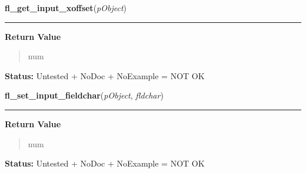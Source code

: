     \label{xformslib:library:fl_get_input_xoffset}

    \vspace{0.5ex}

\hspace{.8\funcindent}\begin{boxedminipage}{\funcwidth}

    \raggedright \textbf{fl\_get\_input\_xoffset}(\textit{pObject})

    \vspace{-1.5ex}

    \rule{\textwidth}{0.5\fboxrule}
\setlength{\parskip}{2ex}
\setlength{\parskip}{1ex}
      \textbf{Return Value}
    \vspace{-1ex}

      \begin{quote}
      num

      \end{quote}

\textbf{Status:} Untested + NoDoc + NoExample = NOT OK



    \end{boxedminipage}

    \label{xformslib:library:fl_set_input_fieldchar}

    \vspace{0.5ex}

\hspace{.8\funcindent}\begin{boxedminipage}{\funcwidth}

    \raggedright \textbf{fl\_set\_input\_fieldchar}(\textit{pObject}, \textit{fldchar})

    \vspace{-1.5ex}

    \rule{\textwidth}{0.5\fboxrule}
\setlength{\parskip}{2ex}
\setlength{\parskip}{1ex}
      \textbf{Return Value}
    \vspace{-1ex}

      \begin{quote}
      num

      \end{quote}

\textbf{Status:} Untested + NoDoc + NoExample = NOT OK



    \end{boxedminipage}

